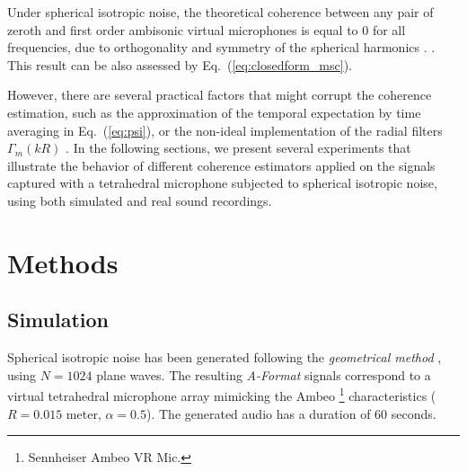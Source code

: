 Under spherical isotropic noise, the theoretical coherence between any pair of zeroth and first order ambisonic virtual microphones is equal to 0 for all frequencies, due to orthogonality and symmetry of the spherical harmonics \cite{elko_spatial_2001}. . This result can be also assessed by Eq.~(\ref{eq:closedform_msc}).

However, there are several practical factors that might corrupt the coherence estimation, such as the approximation of the temporal expectation by time averaging \cite{thiergart_diffuseness_2011} in Eq.~(\ref{eq:psi}), or the non-ideal implementation of the radial filters $\Gamma_m(kR)$ \cite{schorkhuber_ambisonic_2017}.
In the following sections, we present several experiments that illustrate the behavior of different coherence estimators applied on the signals captured with a tetrahedral microphone subjected to spherical isotropic noise, using both simulated and real sound recordings.



\section{Methods}

\subsection{Simulation}
Spherical isotropic noise has been generated following the \textit{geometrical method} \cite{habets_generating_2007, habets_comments_2010}, using $N = 1024$ plane waves. The resulting \textit{A-Format} signals correspond to a virtual tetrahedral microphone array mimicking the Ambeo
\footnote{Sennheiser Ambeo VR Mic. 
}
characteristics ($R=0.015$ meter, $\alpha=0.5$). 
The generated audio has a duration of 60 seconds. 





